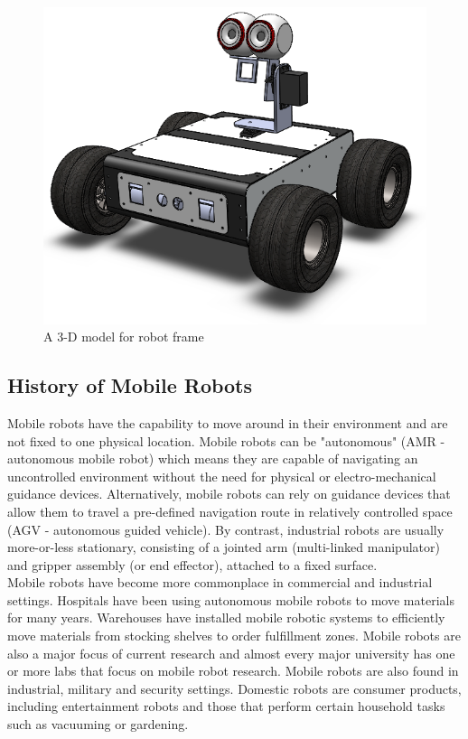 \documentclass[12pt]{article}
\begin{document}
\begin{figure}[h]
\centering
\includegraphics[width =.4\textwidth]{Fig/Introduction.png}
\caption{ A 3-D model for robot frame}
\end{figure}


\subsection{History of Mobile Robots} 
Mobile robots have the capability to move around in their environment and are not fixed to one physical location. Mobile robots can be "autonomous" (AMR - autonomous mobile robot) which means they are capable of navigating an uncontrolled environment without the need for physical or electro-mechanical guidance devices. Alternatively, mobile robots can rely on guidance devices that allow them to travel a pre-defined navigation route in relatively controlled space (AGV - autonomous guided vehicle). By contrast, industrial robots are usually more-or-less stationary, consisting of a jointed arm (multi-linked manipulator) and gripper assembly (or end effector), attached to a fixed surface.\\
Mobile robots have become more commonplace in commercial and industrial settings. Hospitals have been using autonomous mobile robots to move materials for many years. Warehouses have installed mobile robotic systems to efficiently move materials from stocking shelves to order fulfillment zones. Mobile robots are also a major focus of current research and almost every major university has one or more labs that focus on mobile robot research. Mobile robots are also found in industrial, military and security settings. Domestic robots are consumer products, including entertainment robots and those that perform certain household tasks such as vacuuming or gardening. \cite{202}
\end{document}
